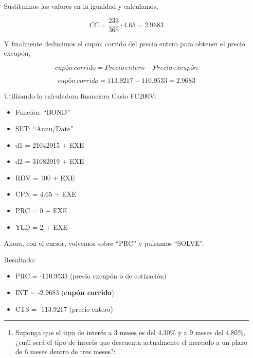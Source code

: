 \documentclass[
  letterpaper,
  DIV=11,
  numbers=noendperiod]{scrreprt}
\providecommand{\tightlist}{%
  \setlength{\itemsep}{0pt}\setlength{\parskip}{0pt}}\usepackage{longtable,booktabs,array}
\begin{document}
\begin{tcolorbox}[enhanced jigsaw, left=2mm, opacityback=0, colback=white, breakable, arc=.35mm, bottomrule=.15mm, rightrule=.15mm, toprule=.15mm, leftrule=.75mm, colframe=quarto-callout-tip-color-frame]
\begin{minipage}[t]{\textwidth - 5.5mm}
Sustituimos los valores en la igualdad y calculamos,

\[CC=\frac{233}{365}\cdot 4.65=2.9683\]

Y finalmente deducimos el cupón corrido del precio entero para obtener
el precio excupón,

\[cupón\,corrido = Precio\,entero - Precio\,excupón\]

\[cupón\,corrido = 113.9217 - 110.9533 = 2.9683\]

Utilizando la calculadora financiera Casio FC200V:

\begin{itemize}
\item
  Función: ``BOND''
\item
  SET: ``Annu/Date''
\item
  d1 = 21042015 + EXE
\item
  d2 = 31082019 + EXE
\item
  RDV = 100 + EXE
\item
  CPN = 4.65 + EXE
\item
  PRC = 0 + EXE
\item
  YLD = 2 + EXE
\end{itemize}

Ahora, con el cursor, volvemos sobre ``PRC'' y pulsamos ``SOLVE''.

Resultado:

\begin{itemize}
\item
  PRC = -110.9533 (precio excupón o de cotización)
\item
  INT = -2.9683 (\textbf{cupón corrido})
\item
  CTS = -113.9217 (precio entero)
\end{itemize}

\end{minipage}%
\end{tcolorbox}

\begin{center}\rule{0.5\linewidth}{0.5pt}\end{center}

\begin{enumerate}
\def\labelenumi{\arabic{enumi}.}
\setcounter{enumi}{35}
\tightlist
\item
  Suponga que el tipo de interés a 3 meses es del 4,30\% y a 9 meses del
  4,80\%, ¿cuál será el tipo de interés que descuenta actualmente el
  mercado a un plazo de 6 meses dentro de tres meses?:
\end{enumerate}
\end{document}
